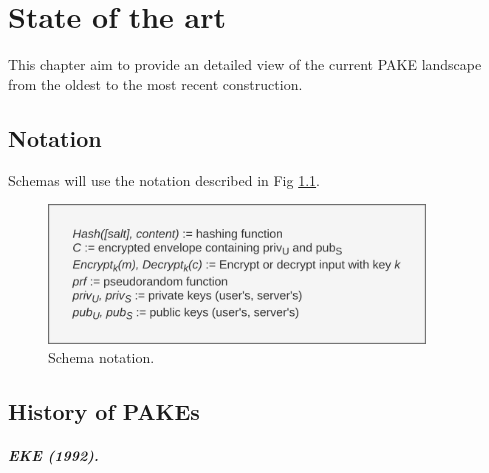 \documentclass[../report.tex]{subfiles}
\begin{document}




\chapter{State of the art}

This chapter aim to provide an detailed view of the current PAKE landscape from the oldest to the most recent construction.

\section{Notation}

Schemas will use the notation described in Fig \ref{fig:notation}.

\begin{figure}[h]
 \centering
 \includegraphics[width=10cm]{notation.png}
 \caption{Schema notation.}
 \label{fig:notation}
\end{figure}



\section{History of PAKEs}

\paragraph{EKE (1992).}
\end{document}
